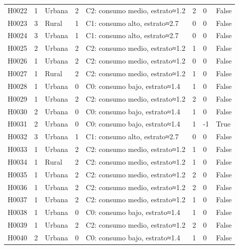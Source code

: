 {\begin{longtable}{@{}llllp{}lll@{}}
H0022 & 1 & Urbana & 2 & C2: consumo medio, estrato≈1.2 & 2 & 0 & False \\
H0023 & 3 & Rural & 1 & C1: consumo alto, estrato≈2.7 & 0 & 0 & False \\
H0024 & 3 & Urbana & 1 & C1: consumo alto, estrato≈2.7 & 0 & 0 & False \\
H0025 & 2 & Urbana & 2 & C2: consumo medio, estrato≈1.2 & 1 & 0 & False \\
H0026 & 1 & Urbana & 2 & C2: consumo medio, estrato≈1.2 & 0 & 0 & False \\
H0027 & 1 & Rural & 2 & C2: consumo medio, estrato≈1.2 & 1 & 0 & False \\
H0028 & 1 & Urbana & 0 & C0: consumo bajo, estrato≈1.4 & 1 & 0 & False \\
H0029 & 1 & Urbana & 2 & C2: consumo medio, estrato≈1.2 & 2 & 0 & False \\
H0030 & 2 & Urbana & 0 & C0: consumo bajo, estrato≈1.4 & 1 & 0 & False \\
H0031 & 2 & Urbana & 0 & C0: consumo bajo, estrato≈1.4 & 1 & -1 & True \\
H0032 & 3 & Urbana & 1 & C1: consumo alto, estrato≈2.7 & 0 & 0 & False \\
H0033 & 1 & Urbana & 2 & C2: consumo medio, estrato≈1.2 & 1 & 0 & False \\
H0034 & 1 & Rural & 2 & C2: consumo medio, estrato≈1.2 & 1 & 0 & False \\
H0035 & 1 & Urbana & 2 & C2: consumo medio, estrato≈1.2 & 2 & 0 & False \\
H0036 & 1 & Urbana & 2 & C2: consumo medio, estrato≈1.2 & 2 & 0 & False \\
H0037 & 1 & Urbana & 2 & C2: consumo medio, estrato≈1.2 & 1 & 0 & False \\
H0038 & 1 & Urbana & 0 & C0: consumo bajo, estrato≈1.4 & 1 & 0 & False \\
H0039 & 1 & Urbana & 2 & C2: consumo medio, estrato≈1.2 & 2 & 0 & False \\
H0040 & 2 & Urbana & 0 & C0: consumo bajo, estrato≈1.4 & 1 & 0 & False \\
\bottomrule
\end{longtable}}
